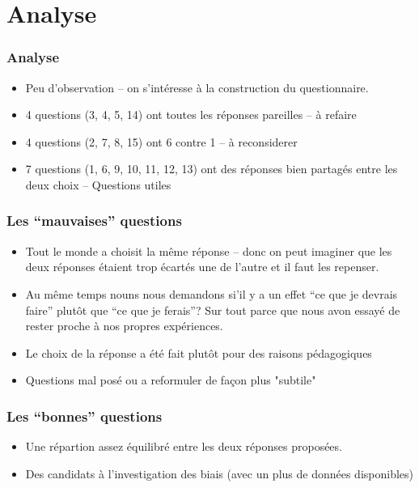 \documentclass{beamer}
\begin{document}
\section{Analyse}
\begin{frame}
  \frametitle{Analyse}
  \begin{itemize}
  \item Peu d'observation -- on s'intéresse à la construction du questionnaire.
  \item 4 questions (3, 4, 5, 14) ont toutes les réponses pareilles -- à refaire
  \item 4 questions (2, 7, 8, 15) ont 6 contre 1 -- à reconsiderer
  \item 7 questions (1, 6, 9, 10, 11, 12, 13) ont des réponses bien partagés
    entre les deux choix -- Questions utiles
  \end{itemize}
\end{frame}

\begin{frame}
  \frametitle{Les ``mauvaises'' questions}
  \begin{itemize}
  \item Tout le monde a choisit la même réponse -- donc on peut imaginer que les deux réponses étaient
  trop écartés une de l'autre et il faut les repenser.
  \item Au même temps nouns nous demandons si'il y a un effet ``ce que je devrais faire'' plutôt que ``ce que 
  je ferais''? Sur tout parce que nous avon essayé de rester proche à nos propres expériences.
 \item Le choix de la réponse a été fait plutôt  pour des raisons pédagogiques  
 \item Questions mal posé ou a reformuler de façon plus "subtile"
\end{itemize}
\end{frame}

\begin{frame}
  \frametitle{Les ``bonnes'' questions}
  \begin{itemize}
  \item Une répartion assez équilibré entre les deux réponses proposées.
  \item  Des candidats à l'investigation des biais (avec un plus de données disponibles)
  \end{itemize}
\end{frame}
\end{document}
